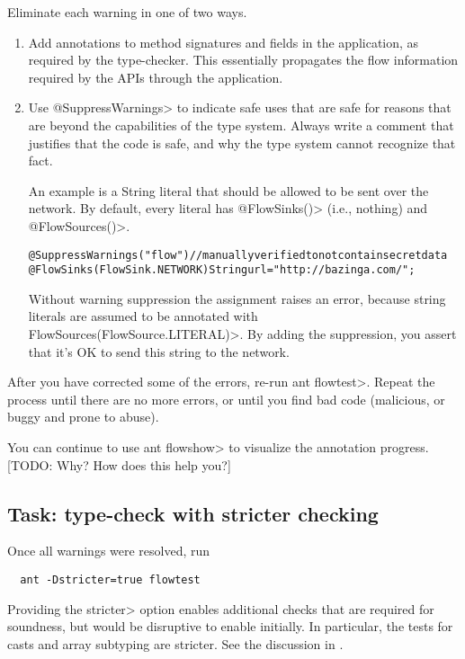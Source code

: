 Eliminate each warning in one of two ways.
\begin{enumerate}
\item Add annotations to method signatures and fields in the application, as
required by the type-checker. This essentially propagates the flow
information required by the APIs through the application.

\item Use \<@SuppressWarnings> to indicate safe uses that are safe for reasons
that are beyond the capabilities of the type system. Always write a
comment that justifies that the code is safe, and why the type system
cannot recognize that fact.

An example is a String literal that should be allowed to be sent
over the network. By default, every literal has \<@FlowSinks()>
(i.e., nothing) and \<@FlowSources()>.

\begin{alltt}
    @SuppressWarnings("flow") // manually verified to not contain secret data
    @FlowSinks(FlowSink.NETWORK) String url = "http://bazinga.com/";
\end{alltt}

Without warning suppression the assignment raises an error, because string literals
are assumed to be annotated with \<FlowSources(FlowSource.LITERAL)>. By adding the suppression, you
assert that it's OK to send this string to the network. 

\end{enumerate}

After you have corrected some of the errors, re-run \<ant flowtest>.
Repeat the process until there are no more errors, or until you find bad
code (malicious, or buggy and prone to abuse).

You can continue to use \<ant flowshow> to visualize the annotation
progress.  [TODO:  Why?  How does this help you?]


\subsection{Task: type-check with stricter checking}

Once all warnings were resolved, run 

\begin{Verbatim}
  ant -Dstricter=true flowtest
\end{Verbatim}

\noindent
Providing the \<stricter> option enables additional checks that are
required for soundness, but would be disruptive to enable initially.
In particular, the tests for casts and array subtyping are stricter.
See the discussion in .

